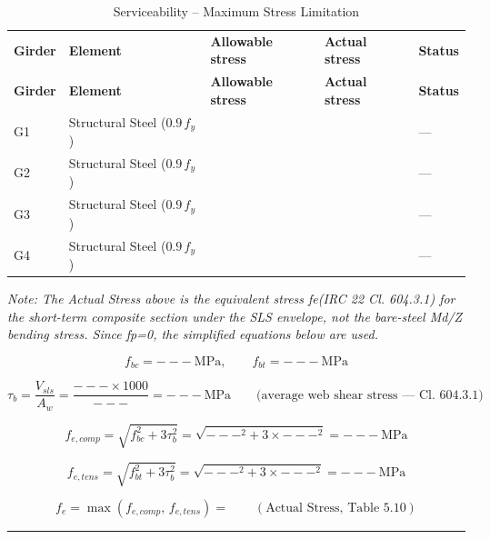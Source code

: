 \documentclass[12pt,a4paper]{report}
\numberwithin{figure}{chapter}
\begin{document}
\vspace{1em}
\begin{longtable}{|C{2.39cm}|L{3.1cm}|C{2.85cm}|C{2.51cm}|C{2.39cm}|}
\caption{Serviceability -- Maximum Stress Limitation}\\
\hline
\textbf{Girder} & \textbf{Element} & \textbf{Allowable stress} & \textbf{Actual stress} & \textbf{Status} \\
\hline
\endfirsthead
\hline
\textbf{Girder} & \textbf{Element} & \textbf{Allowable stress} & \textbf{Actual stress} & \textbf{Status} \\
\hline
\endhead
G1 & Structural Steel ($0.9\,f_y$) &  &  & --- \\
\hline
G2 & Structural Steel ($0.9\,f_y$) &  &  & --- \\
\hline
G3 & Structural Steel ($0.9\,f_y$) &  &  & --- \\
\hline
G4 & Structural Steel ($0.9\,f_y$) &  &  & --- \\
\hline
\end{longtable}
\noindent\textit{Note: The Actual Stress above is the equivalent stress fe(IRC 22 Cl. 604.3.1) for the short-term composite section under the SLS envelope, not the bare-steel Md/Z bending stress. Since fp=0, the simplified equations below are used.}

        \[
        f_{bc} = ---\ \mathrm{MPa}, \qquad
        f_{bt} = ---\ \mathrm{MPa}
        \]

        \[
        \tau_b=\frac{V_{sls}}{A_w}=\frac{---\times1000}{---}=---\ \mathrm{MPa}
        \qquad \text{(average web shear stress --- Cl. 604.3.1)}
        \]

        \[
        f_{e,comp} = \sqrt{f_{bc}^2 + 3\tau_b^2}
        = \sqrt{---^2 + 3\times---^2}
        = ---\ \mathrm{MPa}
        \]

        \[
        f_{e,tens} = \sqrt{f_{bt}^2 + 3\tau_b^2}
        = \sqrt{---^2 + 3\times---^2}
        = ---\ \mathrm{MPa}
        \]

        \[
        f_e = \max\left(f_{e,comp},\,f_{e,tens}\right) = 
        \qquad (\text{Actual Stress, Table 5.10})
        \]
        \smallskip
        \hrule
        \smallskip
        
\end{document}
